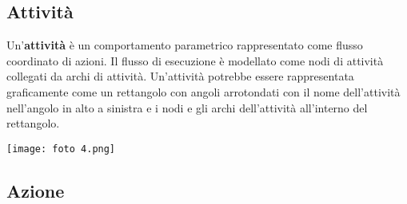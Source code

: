 \documentclass{article}
\begin{document}
\subsection*{Attività}
\large

Un'\textbf{attività} è un comportamento parametrico rappresentato come flusso coordinato di azioni. Il flusso di esecuzione è modellato come nodi di attività collegati da archi di attività.
Un'attività potrebbe essere rappresentata graficamente come un rettangolo con angoli arrotondati con il nome dell'attività nell'angolo in alto a sinistra e i nodi e gli archi dell'attività all'interno del rettangolo.
\begin{center}
    \texttt{[image: foto 4.png]}
\end{center}

\subsection*{Azione}
\large
\end{document}
